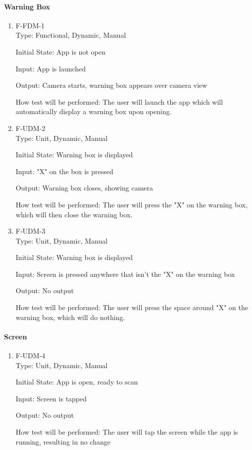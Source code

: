 \documentclass[12pt, titlepage]{article}
\begin{document}
\paragraph{Warning Box}
\begin{enumerate}
\item{F-FDM-1\\}
Type: Functional, Dynamic, Manual
					
Initial State: 
App is not open
					
Input: 
App is launched
					
Output: 
Camera starts, warning box appears over camera view
					
How test will be performed: 
The user will launch the app which will automatically display a warning box upon opening.

\item{F-UDM-2\\}
Type: Unit, Dynamic, Manual
					
Initial State: 
Warning box is displayed
					
Input: 
"X" on the box is pressed
					
Output: 
Warning box closes, showing camera
					
How test will be performed: 
The user will press the "X" on the warning box, which will then close the warning box.

\item{F-UDM-3\\}
Type: Unit, Dynamic, Manual
					
Initial State: 
Warning box is displayed
					
Input: 
Screen is pressed anywhere that isn't the "X" on the warning box
					
Output: 
No output
					
How test will be performed: 
The user will press the space around "X" on the warning box, which will do nothing.

\end{enumerate}

\paragraph{Screen}
\begin{enumerate}
\item{F-UDM-4\\}
Type: Unit, Dynamic, Manual
					
Initial State: 
App is open, ready to scan
					
Input: 
Screen is tapped
					
Output: 
No output
					
How test will be performed: 
The user will  tap the screen while the app is running, resulting in no change

\end{enumerate}
\end{document}
